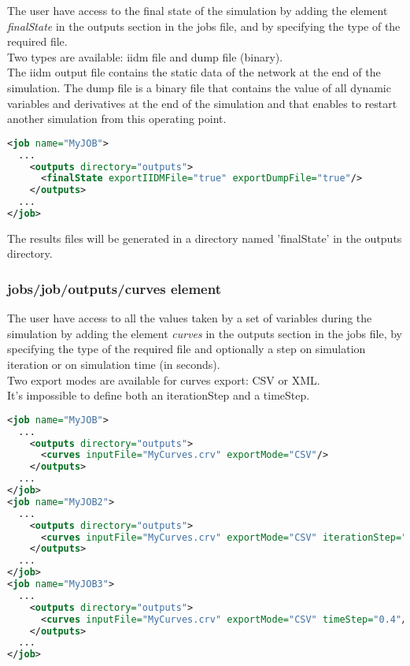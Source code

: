 \documentclass[a4paper, 12pt]{report}
\begin{document}
The user have access to the final state of the simulation by adding the element \textit{finalState}
in the outputs section in the jobs file, and by specifying the type of the required file.\\
Two types are available: iidm file and dump file (binary).\\
The iidm output file contains the static data of the network at the end of the simulation.
The dump file is a binary file that contains the value of all dynamic variables and derivatives at the end of the simulation and that enables to restart another simulation from this operating point.


\begin{lstlisting}[language=XML, morekeywords={finalState},numbers=none]
<job name="MyJOB">
  ...
    <outputs directory="outputs">
      <finalState exportIIDMFile="true" exportDumpFile="true"/>
    </outputs>
  ...
</job>
\end{lstlisting}

The results files will be generated in a directory named 'finalState' in the outputs directory.

\subsubsection{jobs/job/outputs/curves element}
\label{DynawoInputFiles_inputs_jobs_job_outputs_curves}

The user have access to all the values taken by a set of variables during the simulation by adding the element \textit{curves}
in the outputs section in the jobs file, by specifying the type of the required file and optionally a step on simulation iteration or on simulation time (in seconds).\\
Two export modes are available for curves export: CSV or XML.\\
It's impossible to define both an iterationStep and a timeStep.


\begin{lstlisting}[language=XML, morekeywords={curves},numbers=none]
<job name="MyJOB">
  ...
    <outputs directory="outputs">
      <curves inputFile="MyCurves.crv" exportMode="CSV"/>
    </outputs>
  ...
</job>
<job name="MyJOB2">
  ...
    <outputs directory="outputs">
      <curves inputFile="MyCurves.crv" exportMode="CSV" iterationStep="8"/>
    </outputs>
  ...
</job>
<job name="MyJOB3">
  ...
    <outputs directory="outputs">
      <curves inputFile="MyCurves.crv" exportMode="CSV" timeStep="0.4"/>
    </outputs>
  ...
</job>
\end{lstlisting}
\end{document}
